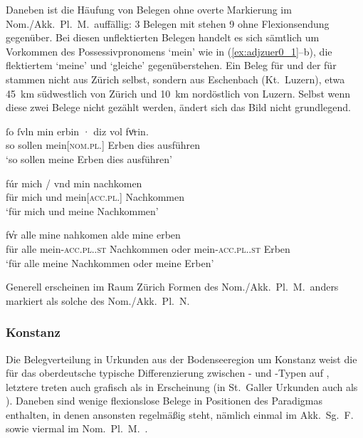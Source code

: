 Daneben ist die Häufung von Belegen ohne overte Markierung
im Nom./Akk.\ Pl.\ M.\ auffällig: 3 Belegen mit  stehen 9 ohne
Flexionsendung gegenüber. Bei diesen unflektierten Belegen handelt es sich
sämtlich um Vorkommen des Possessivpronomens  `mein' wie in
(\ref{ex:adjzuer0_1}--b), die flektiertem  `meine'
 und  `gleiche' gegenüberstehen. Ein Beleg
für  und der für  stammen nicht aus Zürich selbst, sondern
aus Eschenbach (Kt.~Luzern), etwa 45~km südwestlich von Zürich und 10~km
nordöstlich von Luzern. Selbst wenn diese zwei Belege nicht gezählt werden,
ändert sich das Bild nicht grundlegend.

\begin{exe}
\ex \label{ex:adjzuer0}
	\begin{xlist}
	\ex \label{ex:adjzuer0_1}
		\gll ſo ſvln min erbin · diz {vol fvͦrin.} \\
			so sollen mein[\textsc{nom.pl.\MascA}] Erben {} dies ausführen \\
		\trans `so sollen meine Erben dies ausführen'
			\parencites(Nr.~19, Zürich, 1251)[28,20]{cao1}

	\ex \label{ex:adjzuer0_2}
		\gll fúr mich / vnd min nachkomen \\
			für mich {} und mein[\textsc{acc.pl.\MascA}] Nachkommen \\
		\trans `für mich und meine Nachkommen'
			\parencites(Nr.~2051~A, Zürich, 1294)[278,25--26]{cao3}

	\ex \label{ex:adjzuer0_3}
		\gll fv̓r alle mine nahkomen alde mine erben \\
			für alle mein-\textsc{acc.pl.\MascA.st} Nachkommen oder
				mein-\textsc{acc.pl.\MascA.st} Erben \\
		\trans `für alle meine Nachkommen oder meine Erben'
			\parencites(Nr.~1982, Eschenbach, Kt.~Luzern, 1294)[239,20--21]{cao3}
	\end{xlist}
\end{exe}

Generell erscheinen im Raum Zürich Formen des Nom./Akk.\ Pl.\ M.\ anders
markiert als solche des Nom./Akk.\ Pl.\ N.

\subsubsection{Konstanz}
\label{par:adjkonst}
Die Belegverteilung in Urkunden aus der Bodenseeregion um Konstanz weist die
für das oberdeutsche typische Differenzierung zwischen
- und -Typen auf , letztere treten auch
grafisch als  in Erscheinung (in St.~Galler Urkunden auch als
). Daneben sind wenige flexionslose Belege in Positionen des Paradigmas
enthalten, in denen ansonsten regelmäßig  steht, nämlich einmal im
Akk.\ Sg.\ F.\  sowie viermal im Nom.\ Pl.\ M.\
.


